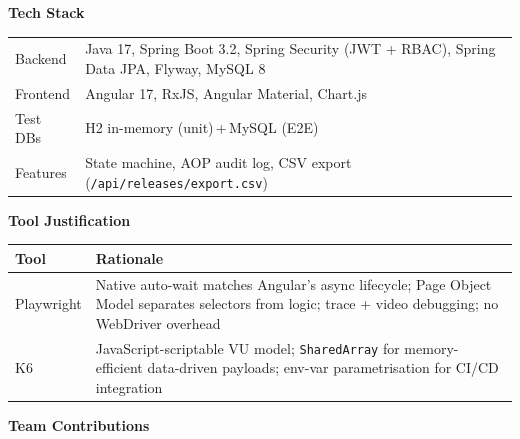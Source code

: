 \documentclass[10pt,a4paper]{article}
\begin{document}
\hfill
\begin{minipage}[t]{0.42\textwidth}

{\small\bfseries\color{cblue}Tech Stack}

\vspace{3pt}

{\small
\begin{tabular}{@{}p{1.55cm}p{4.15cm}@{}}
Backend  & Java 17, Spring Boot 3.2, Spring Security (JWT + RBAC), Spring Data JPA, Flyway, MySQL 8 \\[3pt]
Frontend & Angular 17, RxJS, Angular Material, Chart.js \\[3pt]
Test DBs & H2 in-memory (unit)\,+\,MySQL (E2E) \\[3pt]
Features & State machine, AOP audit log, CSV export (\texttt{/api/releases/export.csv}) \\
\end{tabular}
}

\vspace{7pt}

{\small\bfseries\color{cblue}Tool Justification}

\vspace{3pt}

{\small
\begin{tabular}{@{}p{1.45cm}p{4.25cm}@{}}
\toprule
Tool & Rationale \\
\midrule
Playwright
  & Native auto-wait matches Angular's async lifecycle;
    Page Object Model separates selectors from logic;
    trace + video debugging; no WebDriver overhead \\[5pt]
K6
  & JavaScript-scriptable VU model; \texttt{SharedArray}
    for memory-efficient data-driven payloads;
    env-var parametrisation for CI/CD integration \\
\bottomrule
\end{tabular}
}

\vspace{7pt}

{\small\bfseries\color{cblue}Team Contributions}

\vspace{3pt}


\end{minipage}
\end{document}
